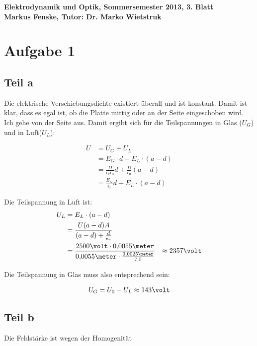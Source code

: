 \documentclass[a4paper,german,12pt,smallheadings]{scrartcl}
\begin{document}
\begin{center}
\bfseries %
\sffamily %
\vspace{-40pt}
Elektrodynamik und Optik, Sommersemester 2013, 3. Blatt \\
Markus Fenske, Tutor: Dr. Marko Wietstruk
\vspace{-10pt}
\end{center}
\section*{Aufgabe 1}

\subsection*{Teil a}
Die elektrische Verschiebungsdichte existiert überall und ist konstant. Damit
ist klar, dass es egal ist, ob die Platte mittig oder an der Seite eingeschoben
wird. Ich gehe von der Seite aus. Damit ergibt sich für die Teilspannungen in
Glas ($U_G$) und in Luft($U_L$):

\begin{align*}
  U &= U_G + U_L \\
    &= E_G \cdot d + E_L \cdot (a-d) \\
    &= \frac{D}{\epsilon_r \epsilon_0} d + \frac{D}{\epsilon_0} (a-d) \\
    &= \frac{E_G}{\epsilon_r} d + E_L \cdot (a-d)
\end{align*}

Die Teilspannung in Luft ist:
\begin{align*}
  U_L &= E_L \cdot (a-d) \\
      &= \frac{U (a-d)A}{(a-d) + \frac{d}{\epsilon_r}} \\
      &= \frac{2500 \volt \cdot 0{,}0055 \meter}{0{,}0055 \meter \cdot \frac{0{,}0025 \meter}{7{,} 5}}
      &\approx 2357 \volt
\end{align*}

Die Teilspannung in Glas muss also entsprechend sein:

\begin{align*}
  U_G = U_0 - U_L \approx 143 \volt
\end{align*}

\subsection*{Teil b}

Die Feldstärke ist wegen der Homogenität
\end{document}
